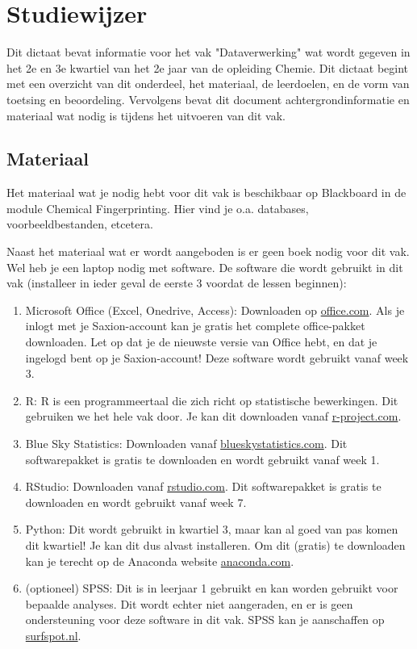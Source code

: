 \chapter{Studiewijzer}

Dit dictaat bevat informatie voor het vak "Dataverwerking" wat wordt gegeven in het 2e en 3e kwartiel van het 2e jaar van de opleiding Chemie. Dit dictaat begint met een overzicht van dit onderdeel, het materiaal, de leerdoelen, en de vorm van toetsing en beoordeling. Vervolgens bevat dit document achtergrondinformatie en materiaal wat nodig is tijdens het uitvoeren van dit vak.


\section{Materiaal}
\label{sec:software}
Het materiaal wat je nodig hebt voor dit vak is beschikbaar op Blackboard in de module Chemical Fingerprinting. Hier vind je o.a. databases, voorbeeldbestanden, etcetera. 

Naast het materiaal wat er wordt aangeboden is er geen boek nodig voor dit vak. Wel heb je een laptop nodig met software. De software die wordt gebruikt in dit vak (installeer in ieder geval de eerste 3 voordat de lessen beginnen):
\begin{enumerate}
    \item Microsoft Office (Excel, Onedrive, Access): Downloaden op \href{https://office.com}{\textsf{office.com}}. Als je inlogt met je Saxion-account kan je gratis het complete office-pakket downloaden. Let op dat je de nieuwste versie van Office hebt, en dat je ingelogd bent op je Saxion-account! Deze software wordt gebruikt vanaf week 3. 
    \item R: R is een programmeertaal die zich richt op statistische bewerkingen. Dit gebruiken we het hele vak door. Je kan dit downloaden vanaf \href{https://cran.uni-muenster.de/}{\textsf{r-project.com}}.
    \item Blue Sky Statistics: Downloaden vanaf \href{https://www.blueskystatistics.com/}{\textsf{blueskystatistics.com}}. Dit softwarepakket is gratis te downloaden en wordt gebruikt vanaf week 1. 
    \item RStudio: Downloaden vanaf \href{https://rstudio.com/}{\textsf{rstudio.com}}. Dit softwarepakket is gratis te downloaden en wordt gebruikt vanaf week 7.
    \item Python: Dit wordt gebruikt in kwartiel 3, maar kan al goed van pas komen dit kwartiel! Je kan dit dus alvast installeren. Om dit (gratis) te downloaden kan je terecht op de Anaconda website \href{https://www.anaconda.com/distribution/}{anaconda.com}.
    \item (optioneel) SPSS: Dit is in leerjaar 1 gebruikt en kan worden gebruikt voor bepaalde analyses. Dit wordt echter niet aangeraden, en er is geen ondersteuning voor deze software in dit vak. SPSS kan je aanschaffen op \href{https://www.surfspot.nl/}{surfspot.nl}.
\end{enumerate}

